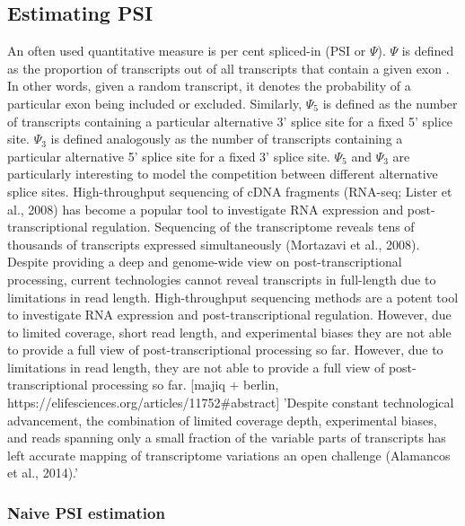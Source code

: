 \subsection{Estimating PSI} \label{subsec:psiestimation}
An often used quantitative measure is per cent spliced-in (PSI or $\Psi$).
$\Psi$ is defined as the proportion of transcripts out of all transcripts that contain a given exon \cite{psi}. In other words, given a random transcript, it denotes the probability of a particular exon being included or excluded.
Similarly, $\Psi_5$ is defined as the number of transcripts containing a particular alternative 3' splice site for a fixed 5' splice site. $\Psi_3$ is defined analogously as the number of transcripts containing a particular alternative 5' splice site for a fixed 3' splice site. $\Psi_5$ and $\Psi_3$ are particularly interesting to model the competition between different alternative splice sites.
High-throughput sequencing of cDNA fragments (RNA-seq; Lister et al., 2008) has become a popular tool to investigate RNA expression and post-transcriptional regulation. Sequencing of the transcriptome reveals tens of thousands of transcripts expressed simultaneously (Mortazavi et al., 2008). Despite providing a deep and genome-wide view on post-transcriptional processing, current technologies cannot reveal transcripts in full-length due to limitations in read length. %
High-throughput sequencing methods are a potent tool to investigate RNA expression and post-transcriptional regulation. However, due to limited coverage, short read length, and experimental biases they are not able to provide a full view of post-transcriptional processing so far.
However, due to limitations in read length, they are not able to provide a full view of post-transcriptional processing so far.
[majiq + berlin, https://elifesciences.org/articles/11752#abstract]
'Despite constant technological advancement, the combination of limited coverage depth, experimental biases, and reads spanning only a small fraction of the variable parts of transcripts has left accurate mapping of transcriptome variations an open challenge (Alamancos et al., 2014).'
\subsubsection{Naive PSI estimation}\label{subsubsec:naivepsi}

